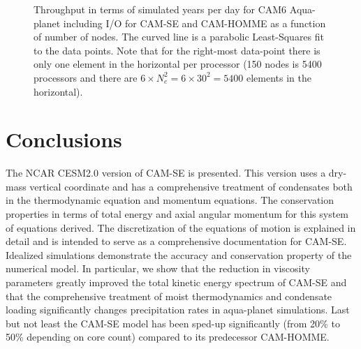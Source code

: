 \documentclass{agujournal}
\begin{document}
{\begin{figure}[h]
 \caption{Throughput in terms of simulated years per day for CAM6 Aqua-planet including I/O for CAM-SE and CAM-HOMME as a function of number of nodes. The curved line is a parabolic Least-Squares fit to the data points. Note that for the right-most data-point there is only one element in the horizontal per processor (150 nodes is 5400 processors and there are $6\times N_e^2=6\times 30^2=5400$ elements in the horizontal).}
 \label{fig:SYPD}
\end{figure}




\section{Conclusions}\label{sec:concl}
The NCAR CESM2.0 version of CAM-SE is presented. This version uses a dry-mass vertical coordinate and has a comprehensive treatment of condensates both in the thermodynamic equation and momentum equations. The conservation properties in terms of total energy and axial angular momentum for this system of equations derived. The discretization of the equations of motion is explained in detail and is intended to serve as a comprehensive documentation for CAM-SE. Idealized simulations demonstrate the accuracy and conservation property of the numerical model. In particular, we show that the reduction in viscosity parameters greatly improved the total kinetic energy spectrum of CAM-SE and that the comprehensive treatment of moist thermodynamics and condensate loading significantly changes precipitation rates in aqua-planet simulations. Last but not least the CAM-SE model has been sped-up significantly (from 20\% to 50\% depending on core count) compared to its predecessor CAM-HOMME.





}
\end{document}

